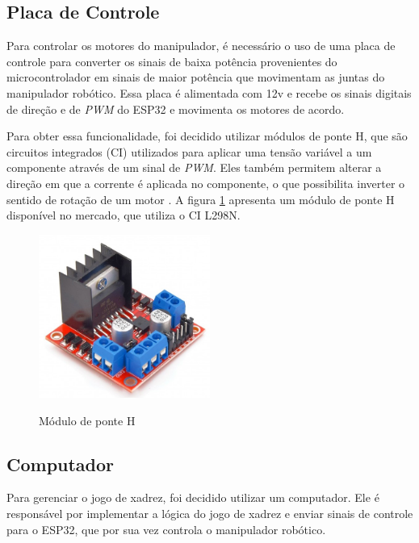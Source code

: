 \subsection[Placa de Controle]{Placa de Controle}
\label{sub:placaControle}

Para controlar os motores do manipulador, é necessário o uso de uma placa de controle para converter os sinais de baixa potência provenientes do microcontrolador em sinais de maior potência que movimentam as juntas do manipulador robótico.
Essa placa é alimentada com 12v e recebe os sinais digitais de direção e de \textit{PWM} do ESP32 e movimenta os motores de acordo.

Para obter essa funcionalidade, foi decidido utilizar módulos de ponte H, que são circuitos integrados (CI) utilizados para aplicar uma tensão variável a um componente através de um sinal de \textit{PWM}.
Eles também permitem alterar a direção em que a corrente é aplicada no componente, o que possibilita inverter o sentido de rotação de um motor \cite{h_bridge}.
A figura \ref{fig:ponteH} apresenta um módulo de ponte H disponível no mercado, que utiliza o CI L298N.

\begin{figure}[H]
    \centering
    \caption{Módulo de ponte H}
    \includegraphics[keepaspectratio=true, width=0.5\textwidth]
    	{img/ponte-h.jpg}
    \label{fig:ponteH}
\end{figure}

\subsection[Computador]{Computador}
\label{sub:computador}

Para gerenciar o jogo de xadrez, foi decidido utilizar um computador.
Ele é responsável por implementar a lógica do jogo de xadrez e enviar sinais de controle para o ESP32, que por sua vez controla o manipulador robótico.

